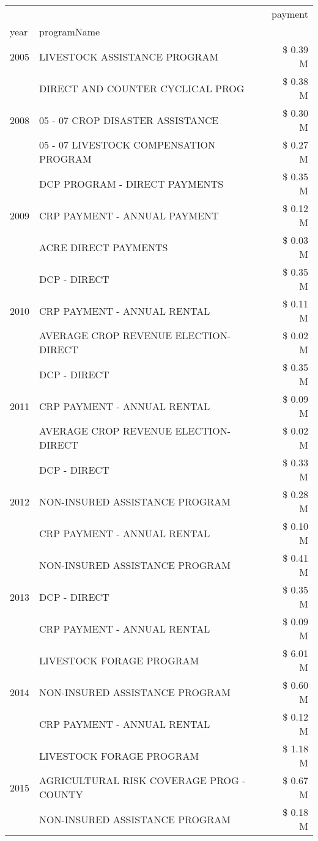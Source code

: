 \begin{tabular}{llr}
\toprule
 &  & payment \\
year & programName &  \\
\midrule
2005 & LIVESTOCK ASSISTANCE PROGRAM & \$ 0.39 M \\
\cline{1-3}
\multirow[t]{3}{*}{2008} & DIRECT AND COUNTER CYCLICAL PROG & \$ 0.38 M \\
 & 05 - 07 CROP DISASTER ASSISTANCE & \$ 0.30 M \\
 & 05 - 07 LIVESTOCK COMPENSATION PROGRAM & \$ 0.27 M \\
\cline{1-3}
\multirow[t]{3}{*}{2009} & DCP PROGRAM - DIRECT PAYMENTS & \$ 0.35 M \\
 & CRP PAYMENT - ANNUAL PAYMENT & \$ 0.12 M \\
 & ACRE DIRECT PAYMENTS & \$ 0.03 M \\
\cline{1-3}
\multirow[t]{3}{*}{2010} & DCP - DIRECT & \$ 0.35 M \\
 & CRP PAYMENT - ANNUAL RENTAL & \$ 0.11 M \\
 & AVERAGE CROP REVENUE ELECTION-DIRECT & \$ 0.02 M \\
\cline{1-3}
\multirow[t]{3}{*}{2011} & DCP - DIRECT & \$ 0.35 M \\
 & CRP PAYMENT - ANNUAL RENTAL & \$ 0.09 M \\
 & AVERAGE CROP REVENUE ELECTION-DIRECT & \$ 0.02 M \\
\cline{1-3}
\multirow[t]{3}{*}{2012} & DCP - DIRECT & \$ 0.33 M \\
 & NON-INSURED ASSISTANCE PROGRAM & \$ 0.28 M \\
 & CRP PAYMENT - ANNUAL RENTAL & \$ 0.10 M \\
\cline{1-3}
\multirow[t]{3}{*}{2013} & NON-INSURED ASSISTANCE PROGRAM & \$ 0.41 M \\
 & DCP - DIRECT & \$ 0.35 M \\
 & CRP PAYMENT - ANNUAL RENTAL & \$ 0.09 M \\
\cline{1-3}
\multirow[t]{3}{*}{2014} & LIVESTOCK FORAGE PROGRAM & \$ 6.01 M \\
 & NON-INSURED ASSISTANCE PROGRAM & \$ 0.60 M \\
 & CRP PAYMENT - ANNUAL RENTAL & \$ 0.12 M \\
\cline{1-3}
\multirow[t]{3}{*}{2015} & LIVESTOCK FORAGE PROGRAM & \$ 1.18 M \\
 & AGRICULTURAL RISK COVERAGE PROG - COUNTY & \$ 0.67 M \\
 & NON-INSURED ASSISTANCE PROGRAM & \$ 0.18 M \\

\end{tabular}
